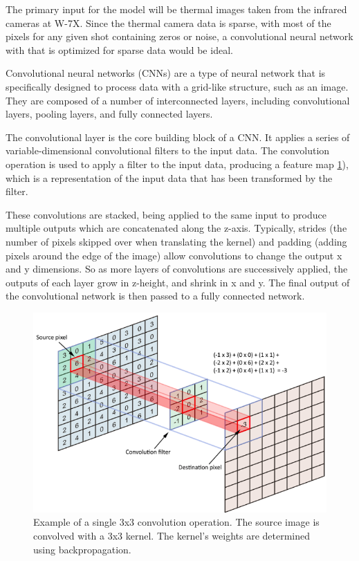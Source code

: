 The primary input for the model will be thermal images taken from the infrared cameras at W-7X. Since the thermal camera data is sparse, with most of the pixels for any given shot containing zeros or noise, a convolutional neural network with that is optimized for sparse data would be ideal.

Convolutional neural networks (CNNs) are a type of neural network that is specifically designed to process data with a grid-like structure, such as an image. They are composed of a number of interconnected layers, including convolutional layers, pooling layers, and fully connected layers.

The convolutional layer is the core building block of a CNN. It applies a series of variable-dimensional convolutional filters to the input data. The convolution operation is used to apply a filter to the input data, producing a feature map \ref{fig:code:2DConv}), which is a representation of the input data that has been transformed by the filter.

These convolutions are stacked, being applied to the same input to produce multiple outputs which are concatenated along the z-axis. Typically, strides (the number of pixels skipped over when translating the kernel) and padding (adding pixels around the edge of the image) allow convolutions to change the output x and y dimensions. So as more layers of convolutions are successively applied, the outputs of each layer grow in z-height, and shrink in x and y. The final output of the convolutional network is then passed to a fully connected network.


\begin{figure}[htb]
    \includegraphics[width=\textwidth]{images/2d-Conv.png}
    \caption{Example of a single 3x3 convolution operation. The source image is convolved with a 3x3 kernel. The kernel's weights are determined using backpropagation.}
    \label{fig:code:2DConv}
\end{figure}

